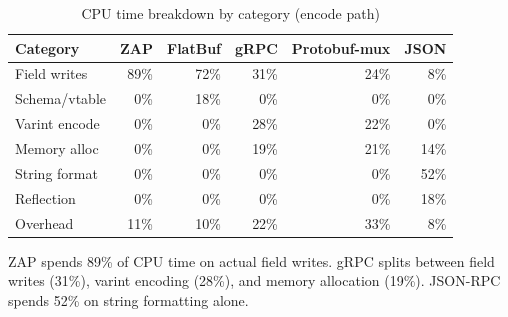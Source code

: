 \begin{table}[h]
\centering
\caption{CPU time breakdown by category (encode path)}
\label{tab:cpuprofile}
\begin{tabular}{lrrrrr}
\toprule
\textbf{Category} & \textbf{ZAP} & \textbf{FlatBuf} & \textbf{gRPC} & \textbf{Protobuf-mux} & \textbf{JSON} \\
\midrule
Field writes & 89\% & 72\% & 31\% & 24\% & 8\% \\
Schema/vtable & 0\% & 18\% & 0\% & 0\% & 0\% \\
Varint encode & 0\% & 0\% & 28\% & 22\% & 0\% \\
Memory alloc & 0\% & 0\% & 19\% & 21\% & 14\% \\
String format & 0\% & 0\% & 0\% & 0\% & 52\% \\
Reflection & 0\% & 0\% & 0\% & 0\% & 18\% \\
Overhead & 11\% & 10\% & 22\% & 33\% & 8\% \\
\bottomrule
\end{tabular}
\end{table}

ZAP spends 89\% of CPU time on actual field writes. gRPC splits between field writes (31\%), varint encoding (28\%), and memory allocation (19\%). JSON-RPC spends 52\% on string formatting alone.

